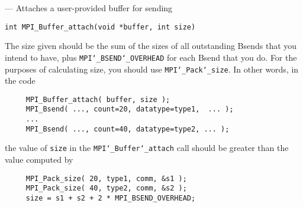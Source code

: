 \startmanpage
{}
--- Attaches a user-provided buffer for sending  
\startvb\begin{verbatim}
int MPI_Buffer_attach(void *buffer, int size)

\end{verbatim}
\endvb

\par
{}
The size given should be the sum of the sizes of all outstanding Bsends that
you intend to have, plus {\tt MPI{\tt \char`\_}BSEND{\tt \char`\_}OVERHEAD} for each Bsend that you do.
For the purposes of calculating size, you should use {\tt MPI{\tt \char`\_}Pack{\tt \char`\_}size}.
In other words, in the code
\begin{verbatim}
     MPI_Buffer_attach( buffer, size );
     MPI_Bsend( ..., count=20, datatype=type1,  ... );
     ...
     MPI_Bsend( ..., count=40, datatype=type2, ... );
\end{verbatim}

the value of {\tt size} in the {\tt MPI{\tt \char`\_}Buffer{\tt \char`\_}attach} call should be greater than
the value computed by
\begin{verbatim}
     MPI_Pack_size( 20, type1, comm, &s1 );
     MPI_Pack_size( 40, type2, comm, &s2 );
     size = s1 + s2 + 2 * MPI_BSEND_OVERHEAD;
\end{verbatim}

